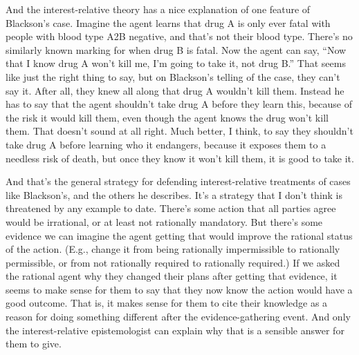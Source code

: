 And the interest-relative theory has a nice explanation of one feature of Blackson's case. Imagine the agent learns that drug A is only ever fatal with people with blood type A2B negative, and that's not their blood type. There's no similarly known marking for when drug B is fatal. Now the agent can say, ``Now that I know drug A won't kill me, I'm going to take it, not drug B.'' That seems like just the right thing to say, but on Blackson's telling of the case, they can't say it. After all, they knew all along that drug A wouldn't kill them. Instead he has to say that the agent shouldn't take drug A before they learn this, because of the risk it would kill them, even though the agent knows the drug won't kill them. That doesn't sound at all right. Much better, I think, to say they shouldn't take drug A before learning who it endangers, because it exposes them to a needless risk of death, but once they know it won't kill them, it is good to take it.

And that's the general strategy for defending interest-relative treatments of cases like Blackson's, and the others he describes. It's a strategy that I don't think is threatened by any example to date. There's some action that all parties agree would be irrational, or at least not rationally mandatory. But there's some evidence we can imagine the agent getting that would improve the rational status of the action. (E.g., change it from being rationally impermissible to rationally permissible, or from not rationally required to rationally required.) If we asked the rational agent why they changed their plans after getting that evidence, it seems to make sense for them to say that they now know the action would have a good outcome. That is, it makes sense for them to cite their knowledge as a reason for doing something different after the evidence-gathering event. And only the interest-relative epistemologist can explain why that is a sensible answer for them to give.
